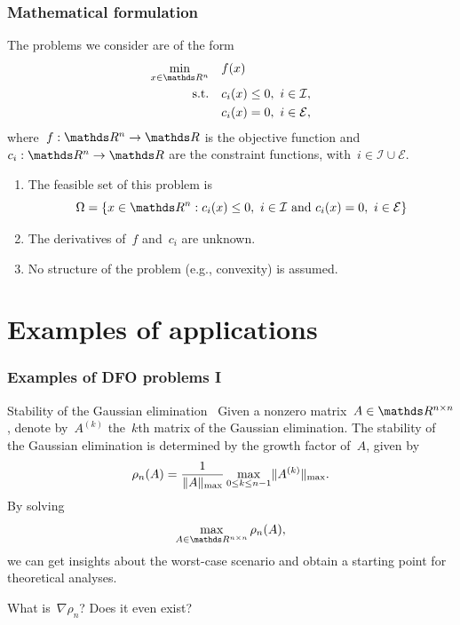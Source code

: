 \documentclass{polyu-presentation}
\newcommand{\con}[1]{c_{#1}}
\newcommand{\ieq}{\mathcal{E}}
\newcommand{\iub}{\mathcal{I}}
\newcommand{\obj}{f}
\begin{document}
\begin{frame}
    \frametitle{Mathematical formulation}

    The problems we consider are of the form
    \begin{align*}
        \min_{x \in \R^n}   & \quad \obj(x)\\
        \text{s.t.}         & \quad \con{i}(x) \le 0, ~ i \in \iub,\\
                            & \quad \con{i}(x) = 0, ~ i \in \ieq,
    \end{align*}
    where~$\obj : \R^n \to \R$ is the \alert{objective function} and~$\con{i} : \R^n \to \R$ are the \alert{constraint functions}, with~$i \in \iub \cup \ieq$.

    \bigskip

    \begin{block}{}
        \begin{enumerate}
            \item The \alert{feasible set} of this problem is
            \begin{equation*}
                \Omega = \set{x \in \R^n : \con{i}(x) \le 0, ~ i \in \iub ~ \mathrm{and} ~ \con{i}(x) = 0, ~ i \in \ieq}
            \end{equation*}
            \item The derivatives of~$\obj$ and~$\con{i}$ are \alert{unknown}.
            \item \alert{No structure} of the problem (e.g., convexity) is assumed.
        \end{enumerate}
    \end{block}
\end{frame}

\section{Examples of applications}

\begin{frame}
    \frametitle{Examples of DFO problems I}

    \begin{block}{Stability of the Gaussian elimination~\parencite{Higham_1993}}
        Given a nonzero matrix~$A \in \R^{n \times n}$, denote by~$A^{(k)}$ the~$k$th matrix of the \alert{Gaussian elimination}.
        The \alert{stability} of the Gaussian elimination is determined by the \alert{growth factor} of~$A$, given by
        \begin{equation*}
            \rho_n(A) = \frac{1}{\lVert A\rVert_{\max}} \max_{0 \le k \le n - 1} \lVert A^{(k)}\rVert_{\max}.
        \end{equation*}
        By solving
        \begin{equation*}
            \max_{A \in \R^{n \times n}} \rho_n(A),
        \end{equation*}
        we can get insights about the \alert{worst-case scenario} and obtain a starting point for \alert{theoretical analyses}.
    \end{block}

    \bigskip

    What is~\alert{$\nabla \rho_n$}? Does it even exist?
\end{frame}
\end{document}
